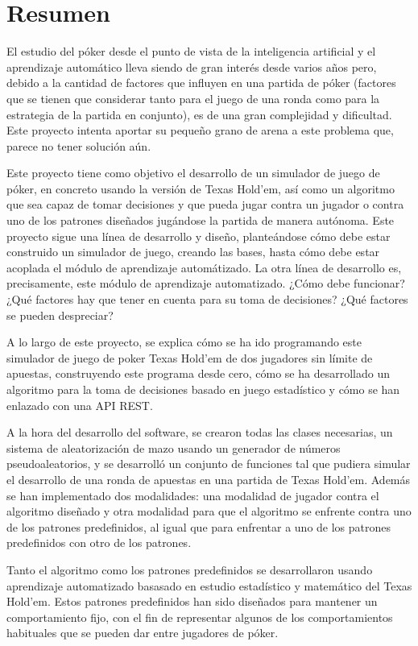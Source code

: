 \chapter{Resumen}

El estudio del póker desde el punto de vista de la inteligencia artificial y el aprendizaje automático lleva siendo de gran interés desde varios años pero, debido a la cantidad de factores que influyen en una partida de póker (factores que se tienen que considerar tanto para el juego de una ronda como para la estrategia de la partida  en conjunto), es de una gran complejidad y dificultad. Este proyecto intenta aportar su pequeño grano de arena a este problema que, parece no tener solución aún.


Este proyecto tiene como objetivo el desarrollo de un simulador de juego de póker, en concreto usando la versión de Texas Hold'em, así como un algoritmo que sea capaz de tomar decisiones y que pueda jugar contra un jugador o contra uno de los patrones diseñados jugándose la partida de manera autónoma.  Este proyecto sigue una línea de desarrollo y diseño, planteándose cómo debe estar construido un simulador de juego, creando las bases, hasta cómo debe estar acoplada el módulo de aprendizaje automátizado.
 La otra línea de desarrollo es, precisamente, este módulo de aprendizaje automatizado. ¿Cómo debe funcionar? ¿Qué factores hay que tener en cuenta para su toma de decisiones? ¿Qué factores se pueden despreciar?

A lo largo de este proyecto, se explica cómo se ha ido programando este simulador de juego de poker Texas Hold'em de dos jugadores sin límite de apuestas, construyendo este programa desde cero, cómo se ha desarrollado un algoritmo para la toma de decisiones basado en juego estadístico y cómo se han enlazado con una API REST. 

A la hora del desarrollo del software, se crearon todas las clases necesarias, un sistema de aleatorización de mazo usando un generador de números pseudoaleatorios, y se desarrolló un conjunto de funciones tal que pudiera simular el desarrollo de una ronda de apuestas en una partida de Texas Hold'em. Además se han implementado dos modalidades: una modalidad de jugador contra el algoritmo diseñado y otra modalidad para que el algoritmo se enfrente contra uno de los patrones predefinidos, al igual que para enfrentar a uno de los patrones predefinidos con otro de los patrones.

Tanto el algoritmo como los patrones predefinidos se desarrollaron usando aprendizaje automatizado basasado en estudio estadístico y matemático del Texas Hold'em. Estos patrones predefinidos han sido diseñados para mantener un comportamiento fijo, con el fin de representar algunos de los comportamientos habituales que se pueden dar entre jugadores de póker.

